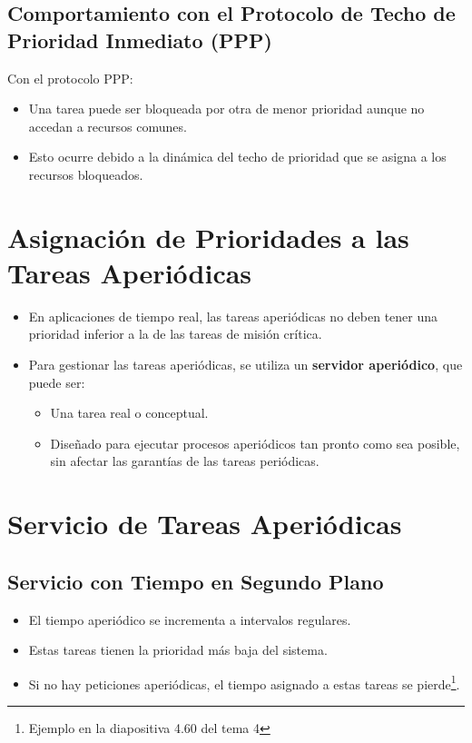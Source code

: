 \documentclass[a4paper,12pt]{article}
\begin{document}
\subsection{Comportamiento con el Protocolo de Techo de Prioridad Inmediato (PPP)}
Con el protocolo PPP:
\begin{itemize}
    \item Una tarea puede ser bloqueada por otra de menor prioridad aunque no accedan a recursos comunes.
    \item Esto ocurre debido a la dinámica del techo de prioridad que se asigna a los recursos bloqueados.
\end{itemize}

\section{Asignación de Prioridades a las Tareas Aperiódicas}

\begin{itemize}
    \item En aplicaciones de tiempo real, las tareas aperiódicas no deben tener una prioridad inferior a la de las tareas de misión crítica.
    \item Para gestionar las tareas aperiódicas, se utiliza un \textbf{servidor aperiódico}, que puede ser:
    \begin{itemize}
        \item Una tarea real o conceptual.
        \item Diseñado para ejecutar procesos aperiódicos tan pronto como sea posible, sin afectar las garantías de las tareas periódicas.
    \end{itemize}
\end{itemize}

\section{Servicio de Tareas Aperiódicas}

\subsection{Servicio con Tiempo en Segundo Plano}
\begin{itemize}
    \item El tiempo aperiódico se incrementa a intervalos regulares.
    \item Estas tareas tienen la prioridad más baja del sistema.
    \item Si no hay peticiones aperiódicas, el tiempo asignado a estas tareas se pierde\footnote{Ejemplo en la diapositiva 4.60 del tema 4}.
\end{itemize}
\end{document}
